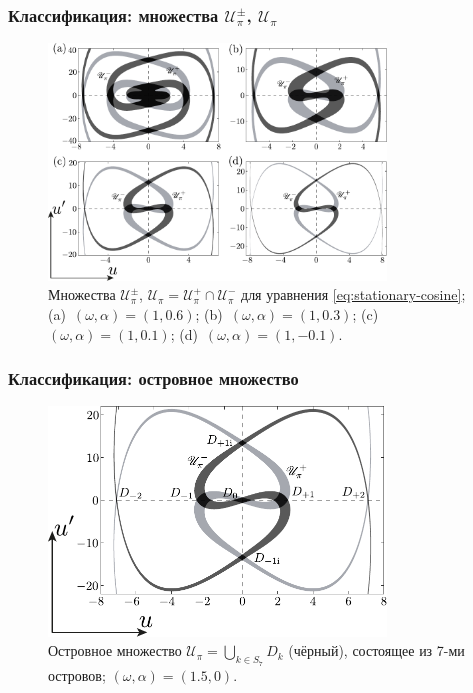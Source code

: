 \documentclass [10pt] {beamer}
\begin{document}
\begin{frame}
	\frametitle{Классификация: множества $\mathscr{U}_{\pi}^{\pm}$, $\mathscr{U}_{\pi}$}
	\begin{figure}
	\includegraphics[width = 0.8\textwidth]{pic/island set emergence for cosine equation}
	\caption{
		Множества $\mathscr{U}_{\pi}^{\pm}$, $\mathscr{U}_{\pi} = \mathscr{U}_{\pi}^+ \cap \mathscr{U}_{\pi}^-$ для уравнения \eqref{eq:stationary-cosine}; (a)~$(\omega, \alpha) = (1, 0.6)$; (b)~$(\omega, \alpha) = (1, 0.3)$; (c)~$(\omega, \alpha) = (1, 0.1)$; (d)~$(\omega, \alpha) = (1, -0.1)$.
	}
	\end{figure}
\end{frame}

\begin{frame}
	\frametitle{Классификация: островное множество}
	
	\begin{figure}[h]
	\includegraphics[width = 0.8\textwidth]{pic/island set to check hypotheses for cosine equation}
	\caption{
		Островное множество $\mathscr{U}_{\pi} = \bigcup_{k \in S_7} D_k$ (чёрный), состоящее из 7-ми островов; $(\omega, \alpha) = (1.5, 0)$.
	}
	\end{figure}
\end{frame}
\end{document}
